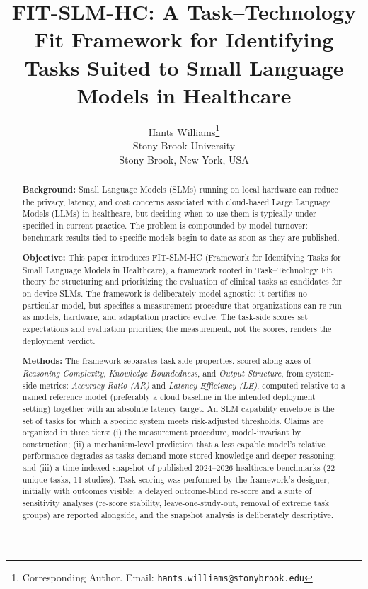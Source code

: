 \documentclass[11pt]{article}
\title{FIT-SLM-HC: A Task--Technology Fit Framework for Identifying Tasks Suited to Small Language Models in Healthcare}
\author{
  Hants Williams\thanks{Corresponding Author. Email: \texttt{hants.williams@stonybrook.edu}} \\
  Stony Brook University \\
  Stony Brook, New York, USA
}
\date{}
\begin{document}
\maketitle

\begin{abstract}
\textbf{Background:}
Small Language Models (SLMs) running on local hardware can reduce the privacy, latency, and cost concerns associated with cloud-based Large Language Models (LLMs) in healthcare, but deciding when to use them is typically under-specified in current practice. The problem is compounded by model turnover: benchmark results tied to specific models begin to date as soon as they are published.

\textbf{Objective:}
This paper introduces FIT-SLM-HC (Framework for Identifying Tasks for Small Language Models in Healthcare), a framework rooted in Task--Technology Fit theory for structuring and prioritizing the evaluation of clinical tasks as candidates for on-device SLMs. The framework is deliberately model-agnostic: it certifies no particular model, but specifies a measurement procedure that organizations can re-run as models, hardware, and adaptation practice evolve. The task-side scores set expectations and evaluation priorities; the measurement, not the scores, renders the deployment verdict.

\textbf{Methods:}
The framework separates task-side properties, scored along axes of \emph{Reasoning Complexity}, \emph{Knowledge Boundedness}, and \emph{Output Structure}, from system-side metrics: \emph{Accuracy Ratio (AR)} and \emph{Latency Efficiency (LE)}, computed relative to a named reference model (preferably a cloud baseline in the intended deployment setting) together with an absolute latency target. An SLM capability envelope is the set of tasks for which a specific system meets risk-adjusted thresholds. Claims are organized in three tiers: (i) the measurement procedure, model-invariant by construction; (ii) a mechanism-level prediction that a less capable model's relative performance degrades as tasks demand more stored knowledge and deeper reasoning; and (iii) a time-indexed snapshot of published 2024--2026 healthcare benchmarks (22 unique tasks, 11 studies). Task scoring was performed by the framework's designer, initially with outcomes visible; a delayed outcome-blind re-score and a suite of sensitivity analyses (re-score stability, leave-one-study-out, removal of extreme task groups) are reported alongside, and the snapshot analysis is deliberately descriptive.


\end{abstract}
\end{document}
